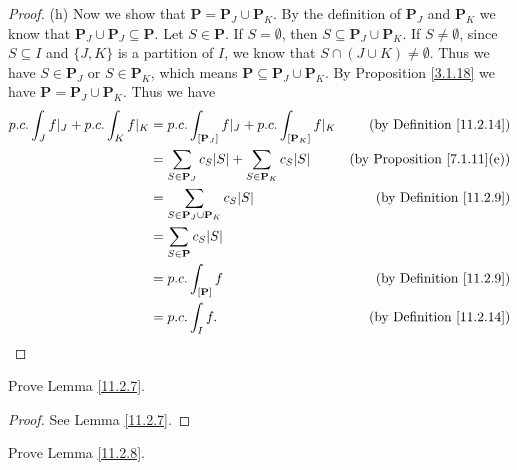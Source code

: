 \begin{proof}{(h)}
    Now we show that \(\mathbf{P} = \mathbf{P}_J \cup \mathbf{P}_K\).
    By the definition of \(\mathbf{P}_J\) and \(\mathbf{P}_K\) we know that \(\mathbf{P}_J \cup \mathbf{P}_J \subseteq \mathbf{P}\).
    Let \(S \in \mathbf{P}\).
    If \(S = \emptyset\), then \(S \subseteq \mathbf{P}_J \cup \mathbf{P}_K\).
    If \(S \neq \emptyset\), since \(S \subseteq I\) and \(\{J, K\}\) is a partition of \(I\), we know that \(S \cap (J \cup K) \neq \emptyset\).
    Thus we have \(S \in \mathbf{P}_J\) or \(S \in \mathbf{P}_K\), which means \(\mathbf{P} \subseteq \mathbf{P}_J \cup \mathbf{P}_K\).
    By Proposition \ref{3.1.18} we have \(\mathbf{P} = \mathbf{P}_J \cup \mathbf{P}_K\).
    Thus we have
    \begin{align*}
        p.c. \int_J f|_J + p.c. \int_K f|_K & = p.c. \int_{[\mathbf{P}_J]} f|_J + p.c. \int_{[\mathbf{P}_K]} f|_K               & \text{(by Definition \ref{11.2.14})}    \\
                                            & = \sum_{S \in \mathbf{P}_J} c_S \abs*{S} + \sum_{S \in \mathbf{P}_K} c_S \abs*{S} & \text{(by Proposition \ref{7.1.11}(e))} \\
                                            & = \sum_{S \in \mathbf{P}_J \cup \mathbf{P}_K} c_S \abs*{S}                        & \text{(by Definition \ref{11.2.9})}     \\
                                            & = \sum_{S \in \mathbf{P}} c_S \abs*{S}                                                                                      \\
                                            & = p.c. \int_{[\mathbf{P}]} f                                                      & \text{(by Definition \ref{11.2.9})}     \\
                                            & = p.c. \int_I f.                                                                  & \text{(by Definition \ref{11.2.14})}
    \end{align*}
\end{proof}

\exercisesection

\begin{exercise}\label{ex 11.2.1}
    Prove Lemma \ref{11.2.7}.
\end{exercise}

\begin{proof}
    See Lemma \ref{11.2.7}.
\end{proof}

\begin{exercise}\label{ex 11.2.2}
    Prove Lemma \ref{11.2.8}.
\end{exercise}

